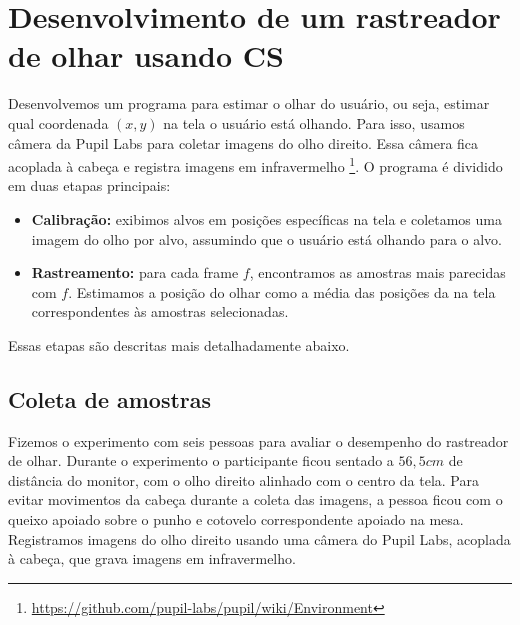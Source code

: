 \chapter{Desenvolvimento de um rastreador de olhar usando CS}

Desenvolvemos um programa para estimar o olhar do usuário, ou seja, estimar qual coordenada $(x,y)$ na tela o usuário está olhando. Para isso, usamos câmera da Pupil Labs para coletar imagens do olho direito. Essa câmera fica acoplada à cabeça e registra imagens em infravermelho \footnote{\url{https://github.com/pupil-labs/pupil/wiki/Environment}}. O programa é dividido em duas etapas principais:

\begin{itemize}
\item {\bf Calibração:} exibimos alvos em posições específicas na tela e coletamos uma imagem do olho por alvo, assumindo que o usuário está olhando para o alvo.

\item {\bf Rastreamento:} para cada frame $f$, encontramos as amostras mais parecidas com $f$. Estimamos a posição do olhar como a média das posições da na tela correspondentes às amostras selecionadas.
\end{itemize}

Essas etapas são descritas mais detalhadamente abaixo.

\section{Coleta de amostras}


Fizemos o experimento com seis pessoas para avaliar o desempenho do rastreador de olhar. Durante o experimento o participante ficou sentado a $56,5cm$ de distância do monitor, com o olho direito alinhado com o centro da tela. Para evitar movimentos da cabeça durante a coleta das imagens, a pessoa ficou com o queixo apoiado sobre o punho e cotovelo correspondente apoiado na mesa. Registramos imagens do olho direito usando uma câmera do Pupil Labs, acoplada à cabeça, que grava imagens em infravermelho.

